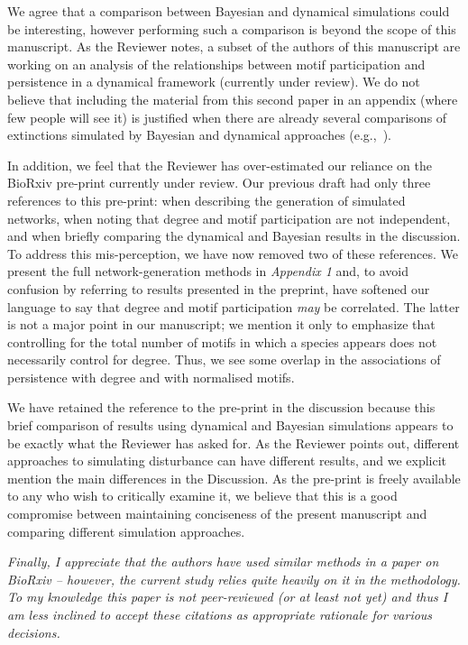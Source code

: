 \documentclass[12pt]{article}
\newcommand{\us}{\rm \setlength{\leftskip}{0.3cm} \setlength{\rightskip}{0.3cm}}
\newcommand{\them}{\it \setlength{\leftskip}{0cm} \setlength{\rightskip}{0cm}}
\begin{document}
        \us We agree that a comparison between Bayesian and dynamical simulations could be interesting, however performing such a comparison is beyond the scope of this manuscript. As the Reviewer notes, a subset of the authors of this manuscript are working on an analysis of the relationships between motif participation and persistence in a dynamical framework (currently under review). We do not believe that including the material from this second paper in an appendix (where few people will see it) is justified when there are already several comparisons of extinctions simulated by Bayesian and dynamical approaches (e.g.,~\citealp[]{Eklof2013a,others}).
        
        
        In addition, we feel that the Reviewer has over-estimated our reliance on the BioRxiv pre-print currently under review. Our previous draft had only three references to this pre-print: when describing the generation of simulated networks, when noting that degree and motif participation are not independent, and when briefly comparing the dynamical and Bayesian results in the discussion.
        To address this mis-perception, we have now removed two of these references.
        We present the full network-generation methods in \emph{Appendix 1} and, to avoid confusion by referring to results presented in the preprint, have softened our language to say that degree and motif participation \emph{may} be correlated. 
        The latter is not a major point in our manuscript; we mention it only to emphasize that controlling for the total number of motifs in which a species appears does not necessarily control for degree. 
        Thus, we see some overlap in the associations of persistence with degree and with normalised motifs.
        
        
        We have retained the reference to the pre-print in the discussion because this brief comparison of results using dynamical and Bayesian simulations appears to be exactly what the Reviewer has asked for.
        As the Reviewer points out, different approaches to simulating disturbance can have different results, and we explicit mention the main differences in the Discussion. 
        As the pre-print is freely available to any who wish to critically examine it, we believe that this is a good compromise between maintaining conciseness of the present manuscript and comparing different simulation approaches.
        
        
        \them
        Finally, I appreciate that the authors have used similar methods in a paper on BioRxiv – however, the current study relies quite heavily on it in the methodology. To my knowledge this paper is not peer-reviewed (or at least not yet) and thus I am less inclined to accept these citations as appropriate rationale for various decisions.
        
\end{document}
